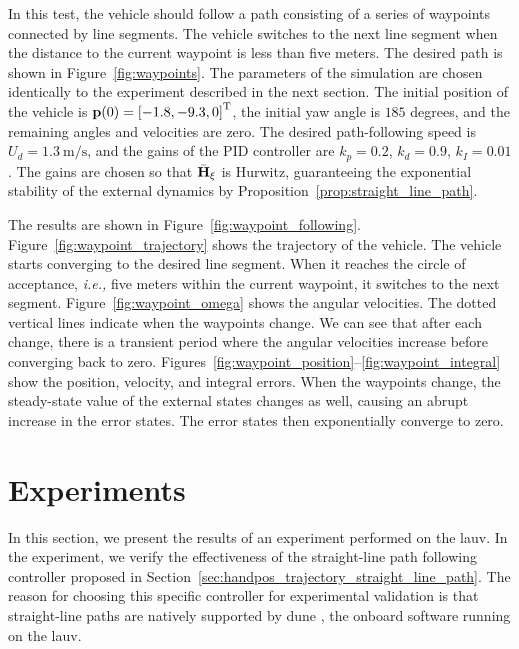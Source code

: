 In this test, the vehicle should follow a path consisting of a series of waypoints connected by line segments.
The vehicle switches to the next line segment when the distance to the current waypoint is less than five meters.
The desired path is shown in Figure~\ref{fig:waypoints}.
The parameters of the simulation are chosen identically to the experiment described in the next section.
The initial position of the vehicle is $\mathbf{p}(0) = \left[-1.8, -9.3, 0\right]^{\mathrm{T}}$, the initial yaw angle is $185$ degrees, and the remaining angles and velocities are zero.
The desired path-following speed is $U_d = \SI{1.3}{\meter\per\second}$, and the gains of the PID controller are $k_p = 0.2$, $k_d = 0.9$, $k_I = 0.01$.
The gains are chosen so that $\Bar{\mathbf{H}}_{\xi}$ is Hurwitz, guaranteeing the exponential stability of the external dynamics by Proposition~\ref{prop:straight_line_path}.

The results are shown in Figure~\ref{fig:waypoint_following}.
Figure~\ref{fig:waypoint_trajectory} shows the trajectory of the vehicle.
The vehicle starts converging to the desired line segment.
When it reaches the circle of acceptance, \emph{i.e.,} five meters within the current waypoint, it switches to the next segment.
Figure~\ref{fig:waypoint_omega} shows the angular velocities.
The dotted vertical lines indicate when the waypoints change.
We can see that after each change, there is a transient period where the angular velocities increase before converging back to zero.
Figures~\ref{fig:waypoint_position}--\ref{fig:waypoint_integral} show the position, velocity, and integral errors.
When the waypoints change, the steady-state value of the external states changes as well, causing an abrupt increase in the error states.
The error states then exponentially converge to zero.

\section{Experiments}
\label{sec:handpos_trajectory_experiments}



In this section, we present the results of an experiment performed on the \gls{lauv}.
In the experiment, we verify the effectiveness of the straight-line path following controller proposed in Section~\ref{sec:handpos_trajectory_straight_line_path}.
The reason for choosing this specific controller for experimental validation is that straight-line paths are natively supported by \gls{dune} \cite{dune}, the onboard software running on the \gls{lauv}.

